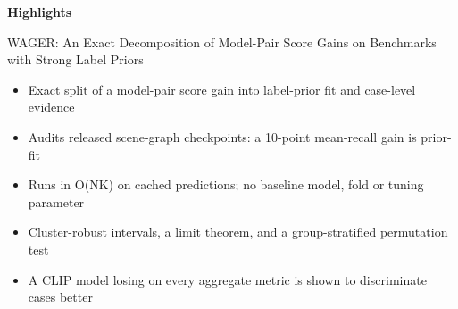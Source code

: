 \documentclass[11pt,a4paper]{article}
\begin{document}
\noindent\textbf{Highlights}

\vspace{0.5em}
\noindent WAGER: An Exact Decomposition of Model-Pair Score Gains on Benchmarks with Strong
Label Priors

\vspace{1em}
\begin{itemize}
\item Exact split of a model-pair score gain into label-prior fit and case-level evidence
\item Audits released scene-graph checkpoints: a 10-point mean-recall gain is prior-fit
\item Runs in O(NK) on cached predictions; no baseline model, fold or tuning parameter
\item Cluster-robust intervals, a limit theorem, and a group-stratified permutation test
\item A CLIP model losing on every aggregate metric is shown to discriminate cases better
\end{itemize}
\end{document}
